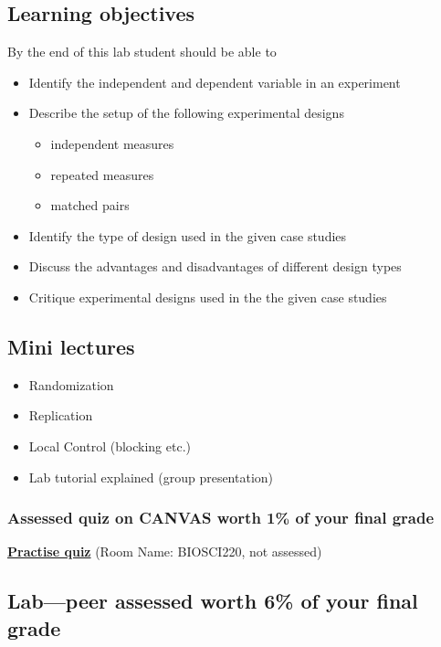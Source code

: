 \documentclass{article}
\begin{document}
\subsection*{Learning objectives}
By the end of this lab student should be able to
\begin{itemize}
  \item Identify the independent and dependent variable in an experiment
\item Describe the setup of the following experimental designs
  \begin{itemize}
  \item independent measures
  \item repeated measures
  \item matched pairs
  \end{itemize}
\item Identify the type of design used in the given case studies
\item Discuss the advantages and disadvantages of different design types
\item Critique experimental designs used in the the given case studies
\end{itemize}

\subsection*{Mini lectures}

\begin{itemize}
\item Randomization
\item Replication
\item Local Control (blocking etc.)
\item Lab tutorial explained (group presentation)
\end{itemize}

\subsubsection*{Assessed quiz on CANVAS worth 1\% of your final grade}

\begin{center}
  \href{https://b.socrative.com/login/student/}{\textbf{\Large Practise quiz}} (Room Name: BIOSCI220, not assessed)
  
\end{center}



\subsection*{Lab---peer assessed worth 6\% of your final grade}
\end{document}
